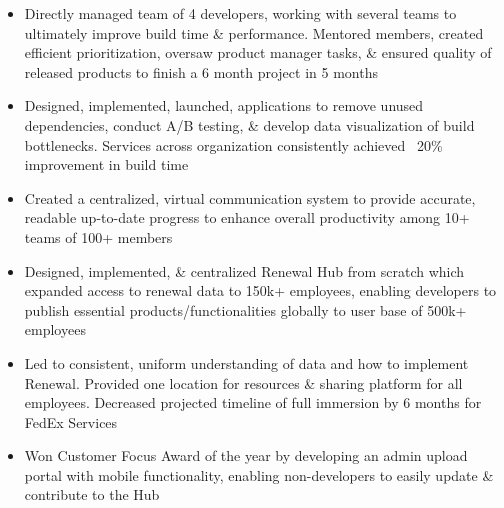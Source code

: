\documentclass[10pt,a4paper,ragged2e]{altacv}
\begin{document}
\tagline{}


\begin{fullwidth}
\makecvheader
\end{fullwidth}



\begin{itemize}
\item {Directly managed team of 4 developers, working with several teams to ultimately improve build time \& performance. Mentored members, created efficient prioritization, oversaw product manager tasks, \& ensured quality of released products to finish a 6 month project in 5 months}

\item{Designed, implemented, launched, applications to remove unused dependencies, conduct A/B testing, \& develop data visualization of build bottlenecks. Services across organization consistently achieved ~20\% improvement in build time}

\item{Created a centralized, virtual communication system to provide accurate, readable up-to-date progress to enhance overall productivity among 10+ teams of 100+ members}
\end{itemize}

\divider \newline
{}
\begin{itemize}
\item {Designed, implemented, \& centralized Renewal Hub from scratch which expanded access to renewal data to 150k+ employees, enabling developers to publish essential products/functionalities globally to user base of 500k+ employees}

\item{Led to consistent, uniform understanding of data and how to implement Renewal. Provided one location for resources \& sharing platform for all employees. Decreased projected timeline of full immersion by 6 months for FedEx Services}

\item{Won Customer Focus Award of the year by developing an admin upload portal with mobile functionality, enabling non-developers to easily update \& contribute to the Hub}
\end{itemize}
\end{document}
